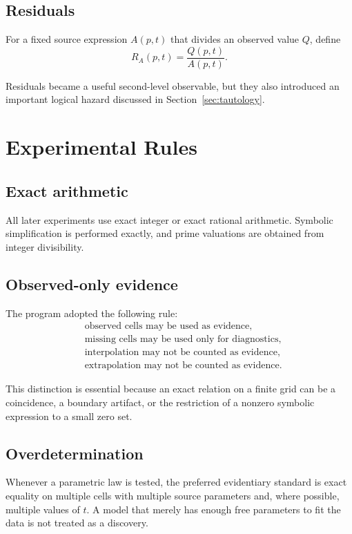 \documentclass[11pt,a4paper]{article}
\begin{document}
\subsection{Residuals}

For a fixed source expression $A(p,t)$ that divides an observed value $Q$, define
\[
R_A(p,t)=\frac{Q(p,t)}{A(p,t)}.
\]

Residuals became a useful second-level observable, but they also introduced an important logical hazard discussed in Section~\ref{sec:tautology}.

\section{Experimental Rules}

\subsection{Exact arithmetic}

All later experiments use exact integer or exact rational arithmetic. Symbolic simplification is performed exactly, and prime valuations are obtained from integer divisibility.

\subsection{Observed-only evidence}

The program adopted the following rule:
\begin{align}
&\text{observed cells may be used as evidence},\\
&\text{missing cells may be used only for diagnostics},\\
&\text{interpolation may not be counted as evidence},\\
&\text{extrapolation may not be counted as evidence}.
\end{align}

This distinction is essential because an exact relation on a finite grid can be a coincidence, a boundary artifact, or the restriction of a nonzero symbolic expression to a small zero set.

\subsection{Overdetermination}

Whenever a parametric law is tested, the preferred evidentiary standard is exact equality on multiple cells with multiple source parameters and, where possible, multiple values of $t$. A model that merely has enough free parameters to fit the data is not treated as a discovery.
\end{document}
